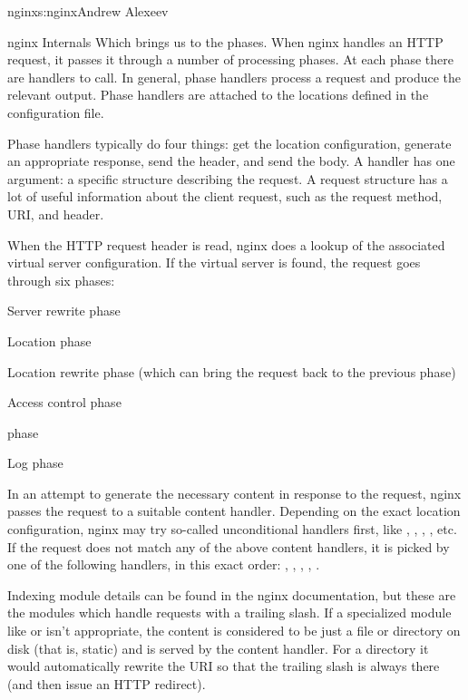 \begin{aosachapter}{nginx}{s:nginx}{Andrew Alexeev}
\begin{aosasect1}{nginx Internals}
Which brings us to the phases. When nginx handles an HTTP request, it
passes it through a number of processing phases. At each phase there
are handlers to call. In general, phase handlers process a request and
produce the relevant output. Phase handlers are attached to the
locations defined in the configuration file.

Phase handlers typically do four things: get the location
configuration, generate an appropriate response, send the header, and
send the body. A handler has one argument: a specific structure
describing the request. A request structure has a lot of useful
information about the client request, such as the request method, URI,
and header.

When the HTTP request header is read, nginx does a lookup of the
associated virtual server configuration. If the virtual server is
found, the request goes through six phases:

\begin{aosaenumerate}

\item Server rewrite phase

\item Location phase

\item Location rewrite phase (which can bring the request back to the
previous phase)

\item Access control phase

\item {} phase

\item Log phase

\end{aosaenumerate}

In an attempt to generate the necessary content in response to the
request, nginx passes the request to a suitable content
handler. Depending on the exact location configuration, nginx may try
so-called unconditional handlers first, like ,
, , , etc. If the request does
not match any of the above content handlers, it is picked by one of
the following handlers, in this exact order: ,
, , , .

Indexing module details can be found in the nginx documentation, but
these are the modules which handle requests with a trailing slash. If
a specialized module like  or  isn't
appropriate, the content is considered to be just a file or directory
on disk (that is, static) and is served by the  content
handler. For a directory it would automatically rewrite the URI so
that the trailing slash is always there (and then issue an HTTP
redirect).


\end{aosasect1}
\end{aosachapter}
